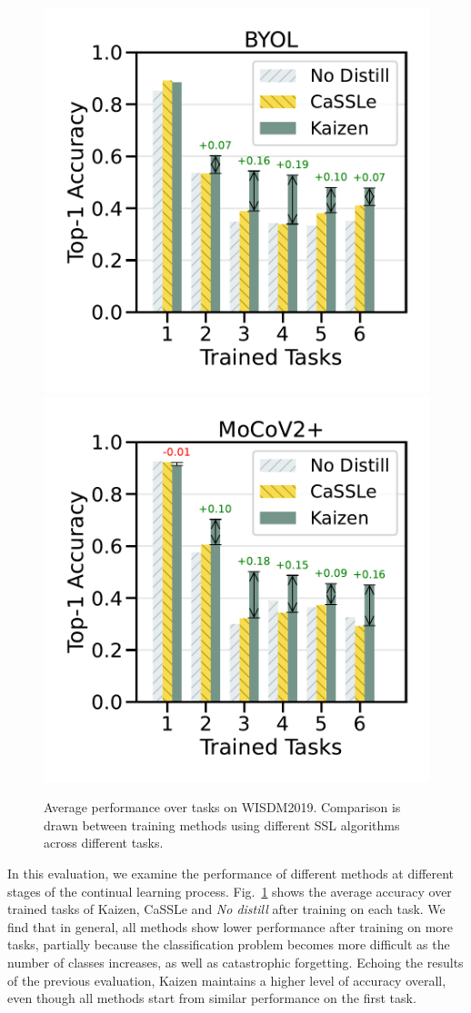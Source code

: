 \begin{figure}
    \centering
    \includegraphics[width=0.49 \linewidth ]{figures_new/Part_1/F3-WISDM2019-BYOL-6Tasks-v2.pdf}
    \includegraphics[width=0.49 \linewidth ]{figures_new/Part_1/F3-WISDM2019-MoCoV2+-6Tasks-v2.pdf}
    \vspace{-0.2in}
    \caption{Average performance over tasks on WISDM2019. Comparison is drawn between training methods using different SSL algorithms across different tasks.}
        \vspace{-0.1in}
    \label{fig:performance_across_time_cifar}
\end{figure}

In this evaluation, we examine the performance of different methods at different stages of the continual learning process. Fig.~\ref{fig:performance_across_time_cifar} shows the average accuracy over trained tasks of Kaizen, CaSSLe and \emph{No distill} after training on each task. We find that in general, all methods show lower performance after training on more tasks, partially because the classification problem becomes more difficult as the number of classes increases, as well as catastrophic forgetting. Echoing the results of the previous evaluation, Kaizen maintains a higher level of accuracy overall, even though all methods start from similar performance on the first task.


